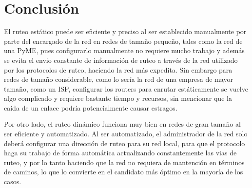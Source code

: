 \documentclass[spanish]{udpreport}
\begin{document}
\chapter{Conclusión}
El ruteo estático puede ser eficiente y preciso al ser establecido manualmente por parte del encargado de la red en redes de tamaño pequeño, tales como la red de una PyME, pues configurarlo manualmente no requiere mucho trabajo y además se evita el envio constante de información de ruteo a través de la red utilizado por los protocolos de ruteo, haciendo la red más expedita. Sin embargo para redes de tamaño considerable, como lo sería la red de una empresa de mayor tamaño, como un ISP, configurar los routers para enrutar estáticamente se vuelve algo complicado y requiere bastante tiempo y recursos, sin mencionar que la caída de un enlace podría potencialmente causar estragos. %

Por otro lado, el ruteo dinámico funciona muy bien en redes de gran tamaño al ser eficiente y automatizado. Al ser automatizado, el administrador de la red solo deberá configurar una dirección de ruteo para su red local, para que el protocolo haga su trabajo de forma automática actualizando constantemente las vias de ruteo, y por lo tanto haciendo que la red no requiera de mantención en términos de caminos, lo que lo convierte en el candidato más óptimo en la mayoría de los casos.

 \LARGE 
\noindent
\listoffigures
\end{document}
